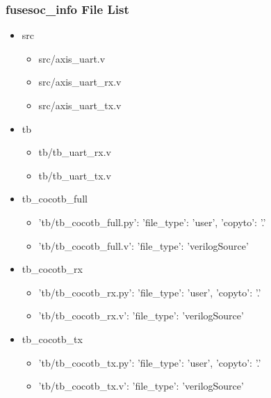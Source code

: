 \subsubsection{fusesoc\_info File List}
\begin{itemize}
\item src
	\begin{itemize}
	\item src/axis\_uart.v
	\item src/axis\_uart\_rx.v
	\item src/axis\_uart\_tx.v
	\end{itemize}
\item tb
	\begin{itemize}
	\item tb/tb\_uart\_rx.v
	\item tb/tb\_uart\_tx.v
	\end{itemize}
\item tb\_cocotb\_full
	\begin{itemize}
	\item {'tb/tb\_cocotb\_full.py': {'file\_type': 'user', 'copyto': '.'}}
	\item {'tb/tb\_cocotb\_full.v': {'file\_type': 'verilogSource'}}
	\end{itemize}
\item tb\_cocotb\_rx
	\begin{itemize}
	\item {'tb/tb\_cocotb\_rx.py': {'file\_type': 'user', 'copyto': '.'}}
	\item {'tb/tb\_cocotb\_rx.v': {'file\_type': 'verilogSource'}}
	\end{itemize}
\item tb\_cocotb\_tx
	\begin{itemize}
	\item {'tb/tb\_cocotb\_tx.py': {'file\_type': 'user', 'copyto': '.'}}
	\item {'tb/tb\_cocotb\_tx.v': {'file\_type': 'verilogSource'}}
	\end{itemize}
\end{itemize}
